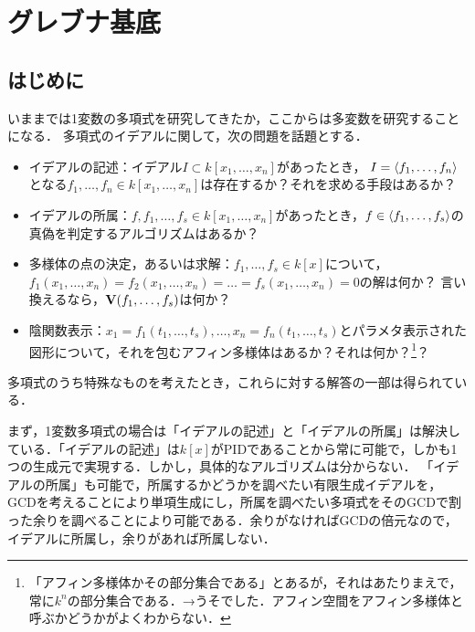 \documentclass[9pt]{ltjsarticle}
\theoremstyle{break}
\theoremstyle{break}
\theoremstyle{break}
\theoremstyle{break}
\theoremstyle{break}
\theoremstyle{break}
\theoremstyle{break}
\theoremstyle{break}
\theoremstyle{break}
\theoremstyle{break}
\theoremstyle{break}
\theoremstyle{break}
\theoremstyle{break}
\theoremstyle{break}
\theoremstyle{break}
\theoremstyle{nonumberbreak}
\theoremstyle{nonumberbreak}
\begin{document}
\section{グレブナ基底}
\subsection{はじめに}
いままでは1変数の多項式を研究してきたか，ここからは多変数を研究することになる．
多項式のイデアルに関して，次の問題を話題とする．
\begin{itemize}
 \item イデアルの記述：イデアル$I\subset k[x_1,\dots,x_n]$があったとき，
$I=\langle f_1,\dots,f_n \rangle$となる$f_1,\dots,f_n \in k[x_1,\dots,x_n]$は存在するか？それを求める手段はあるか？
 \item イデアルの所属：$f,f_1,\dots,f_s \in k[x_1,\dots,x_n]$があったとき，$f\in \langle f_1,\dots,f_s \rangle$の真偽を判定するアルゴリズムはあるか？
 \item 多様体の点の決定，あるいは求解：$f_1,\dots,f_s \in k[x]$について，
$f_1(x_1,\dots,x_n)=f_2(x_1,\dots,x_n)=\dots =f_s(x_1,\dots,x_n)=0$の解は何か？
言い換えるなら，$\textbf V(f_1,\dots,f_s)$は何か？
 \item 陰関数表示：$x_1 = f_1(t_1,\dots,t_s),\dots,x_n=f_n(t_1,\dots,t_s)$とパラメタ表示された図形について，それを包むアフィン多様体はあるか？それは何か？\footnote{「アフィン多様体かその部分集合である」とあるが，それはあたりまえで，常に$k^n$の部分集合である．→うそでした．アフィン空間をアフィン多様体と呼ぶかどうかがよくわからない．}？
\end{itemize}

多項式のうち特殊なものを考えたとき，これらに対する解答の一部は得られている．

まず，1変数多項式の場合は「イデアルの記述」と「イデアルの所属」は解決している．「イデアルの記述」は$k[x]$がPIDであることから常に可能で，しかも1つの生成元で実現する．しかし，具体的なアルゴリズムは分からない．
「イデアルの所属」も可能で，所属するかどうかを調べたい有限生成イデアルを，GCDを考えることにより単項生成にし，所属を調べたい多項式をそのGCDで割った余りを調べることにより可能である．余りがなければGCDの倍元なので，イデアルに所属し，余りがあれば所属しない．
\end{document}
